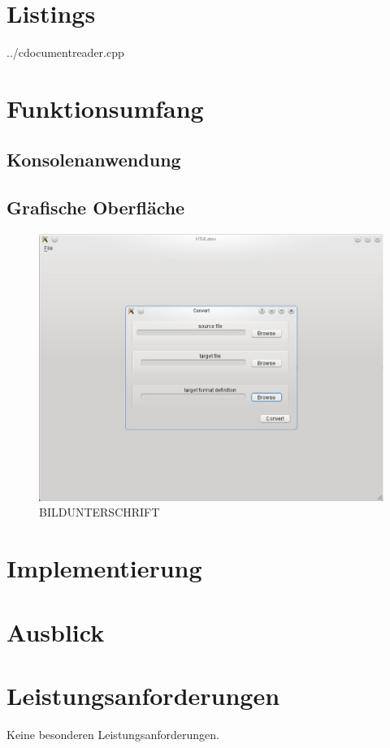 \documentclass[	a4paper,		%
		titlepage, 		%
		fontsize=12pt		%
		]{scrartcl} 		%
\begin{document}
\section{Listings}

	{../cdocumentreader.cpp}

\section{Funktionsumfang}

\subsection{Konsolenanwendung}

\subsection{Grafische Oberfläche}
\begin{figure} [H]
    \centering
	\includegraphics[width=.5\textwidth, keepaspectratio]{./img/screenshot.eps}
    \caption{BILDUNTERSCHRIFT}
\end{figure}

\section{Implementierung}
\begin{figure} [H]
\centering
\resizebox*{.70\textheight}{!}{}
\end{figure}
\section{Ausblick}




\section{Leistungsanforderungen}
Keine besonderen Leistungsanforderungen.
\end{document}
